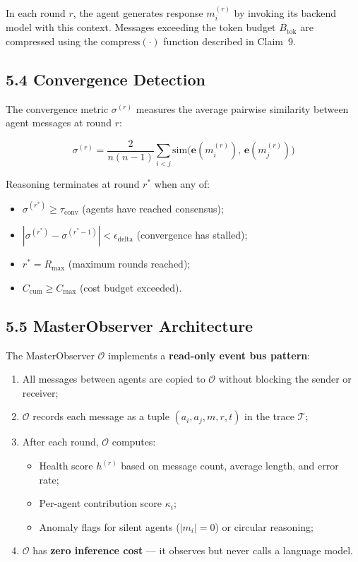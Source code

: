 \documentclass[a4paper,12pt]{article}
\begin{document}
\noindent In each round $r$, the agent generates response $m_i^{(r)}$ by invoking its backend model with this context. Messages exceeding the token budget $B_{\mathrm{tok}}$ are compressed using the $\mathrm{compress}(\cdot)$ function described in Claim~9.

\subsection*{5.4 Convergence Detection}

\noindent The convergence metric $\sigma^{(r)}$ measures the average pairwise similarity between agent messages at round $r$:

$$\sigma^{(r)} = \frac{2}{n(n-1)} \sum_{i<j} \mathrm{sim}\bigl(\mathbf{e}(m_i^{(r)}),\, \mathbf{e}(m_j^{(r)})\bigr)$$

\noindent Reasoning terminates at round $r^*$ when any of:
\begin{itemize}[nosep,leftmargin=2em]
\item $\sigma^{(r^*)} \geq \tau_{\mathrm{conv}}$ (agents have reached consensus);
\item $|\sigma^{(r^*)} - \sigma^{(r^*-1)}| < \epsilon_{\mathrm{delta}}$ (convergence has stalled);
\item $r^* = R_{\max}$ (maximum rounds reached);
\item $C_{\mathrm{cum}} \geq C_{\max}$ (cost budget exceeded).
\end{itemize}

\subsection*{5.5 MasterObserver Architecture}

\noindent The MasterObserver $\mathcal{O}$ implements a \textbf{read-only event bus pattern}:

\begin{enumerate}[nosep,leftmargin=2em]
\item All messages between agents are copied to $\mathcal{O}$ without blocking the sender or receiver;
\item $\mathcal{O}$ records each message as a tuple $(a_i, a_j, m, r, t)$ in the trace $\mathcal{T}$;
\item After each round, $\mathcal{O}$ computes:
  \begin{itemize}[nosep,leftmargin=1.5em]
  \item Health score $h^{(r)}$ based on message count, average length, and error rate;
  \item Per-agent contribution score $\kappa_i$;
  \item Anomaly flags for silent agents ($|m_i| = 0$) or circular reasoning;
  \end{itemize}
\item $\mathcal{O}$ has \textbf{zero inference cost} --- it observes but never calls a language model.
\end{enumerate}
\end{document}
